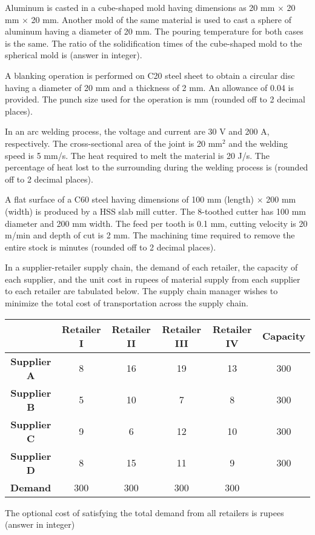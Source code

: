 \bigskip
\item Aluminum is casted in a cube-shaped mold having dimensions as 20 mm $\times$ 20 mm $\times$ 20 mm. Another mold of the same material is used to cast a sphere of aluminum having a diameter of 20 mm. The pouring temperature for both cases is the same. The ratio of the solidification times of the cube-shaped mold to the spherical mold is \underline{\hspace{2cm}} (answer in integer).
\bigskip
\item A blanking operation is performed on C20 steel sheet to obtain a circular disc having a diameter of 20 mm and a thickness of 2 mm. An allowance of 0.04 is provided. The punch size used for the operation is \underline{\hspace{2cm}} mm (rounded off to 2 decimal places).
\bigskip
\item In an arc welding process, the voltage and current are 30 V and 200 A, respectively. The cross-sectional area of the joint is 20 mm\(^2\) and the welding speed is 5 mm/s. The heat required to melt the material is 20 J/s. The percentage of heat lost to the surrounding during the welding process is \underline{\hspace{2cm}} (rounded off to 2 decimal places).
\bigskip
\item A flat surface of a C60 steel having dimensions of 100 mm (length) \(\times\) 200 mm (width) is produced by a HSS slab mill cutter. The 8-toothed cutter has 100 mm diameter and 200 mm width. The feed per tooth is 0.1 mm, cutting velocity is 20 m/min and depth of cut is 2 mm. The machining time required to remove the entire stock is \underline{\hspace{2cm}} minutes (rounded off to 2 decimal places).
\bigskip
\item In a supplier-retailer supply chain, the demand of each retailer, the capacity of each supplier, and the unit cost in rupees of material supply from each supplier to each retailer are tabulated below. The supply chain manager wishes to minimize the total cost of transportation across the supply chain.

\begin{center}
    \begin{tabular}{|c|c|c|c|c|c|}
        \hline
        & \textbf{Retailer I} & \textbf{Retailer II} & \textbf{Retailer III} & \textbf{Retailer IV} & \textbf{Capacity} \\
        \hline
        \textbf{Supplier A} & 8 & 16 & 19 & 13 & 300 \\
        \hline
        \textbf{Supplier B} & 5 & 10 & 7 & 8 & 300 \\
        \hline
        \textbf{Supplier C} & 9 & 6 & 12 & 10 & 300 \\
        \hline
        \textbf{Supplier D} & 8 & 15 & 11 & 9 & 300 \\
        \hline
        \textbf{Demand} & 300 & 300 & 300 & 300 & \\
        \hline
    \end{tabular}
\end{center}
The optional cost of satisfying the total demand from all retailers is \underline{\hspace{1cm}} rupees (answer in integer)
